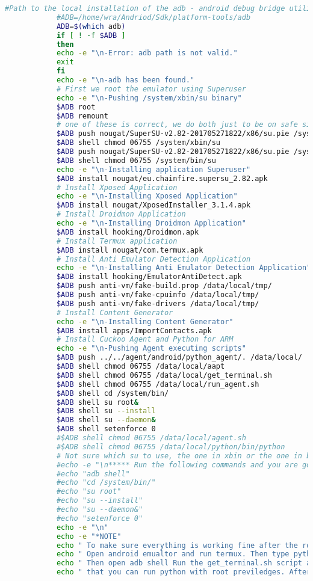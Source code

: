 \documentclass[../main.tex]{subfile}
\begin{document}
\begin{enumerate}
\begin{lstlisting}[language=bash]
			#Path to the local installation of the adb - android debug bridge utility.
			#ADB=/home/wra/Andriod/Sdk/platform-tools/adb
			ADB=$(which adb)
			if [ ! -f $ADB ]
			then
			echo -e "\n-Error: adb path is not valid."
			exit
			fi
			echo -e "\n-adb has been found."
			# First we root the emulator using Superuser
			echo -e "\n-Pushing /system/xbin/su binary"
			$ADB root
			$ADB remount
			# one of these is correct, we do both just to be on safe side
			$ADB push nougat/SuperSU-v2.82-201705271822/x86/su.pie /system/xbin/su
			$ADB shell chmod 06755 /system/xbin/su
			$ADB push nougat/SuperSU-v2.82-201705271822/x86/su.pie /system/bin/su
			$ADB shell chmod 06755 /system/bin/su
			echo -e "\n-Installing application Superuser"
			$ADB install nougat/eu.chainfire.supersu_2.82.apk
			# Install Xposed Application
			echo -e "\n-Installing Xposed Application"
			$ADB install nougat/XposedInstaller_3.1.4.apk
			# Install Droidmon Application
			echo -e "\n-Installing Droidmon Application"
			$ADB install hooking/Droidmon.apk
			# Install Termux application
			$ADB install nougat/com.termux.apk
			# Install Anti Emulator Detection Application
			echo -e "\n-Installing Anti Emulator Detection Application"
			$ADB install hooking/EmulatorAntiDetect.apk
			$ADB push anti-vm/fake-build.prop /data/local/tmp/
			$ADB push anti-vm/fake-cpuinfo /data/local/tmp/
			$ADB push anti-vm/fake-drivers /data/local/tmp/
			# Install Content Generator
			echo -e "\n-Installing Content Generator"
			$ADB install apps/ImportContacts.apk
			# Install Cuckoo Agent and Python for ARM
			echo -e "\n-Pushing Agent executing scripts"
			$ADB push ../../agent/android/python_agent/. /data/local/ 
			$ADB shell chmod 06755 /data/local/aapt
			$ADB shell chmod 06755 /data/local/get_terminal.sh
			$ADB shell chmod 06755 /data/local/run_agent.sh
			$ADB shell cd /system/bin/
			$ADB shell su root&
			$ADB shell su --install
			$ADB shell su --daemon&
			$ADB shell setenforce 0
			#$ADB shell chmod 06755 /data/local/agent.sh
			#$ADB shell chmod 06755 /data/local/python/bin/python
			# Not sure which su to use, the one in xbin or the one in bin
			#echo -e "\n***** Run the following commands and you are good to go*****\n"
			#echo "adb shell"
			#echo "cd /system/bin/"
			#echo "su root"
			#echo "su --install"
			#echo "su --daemon&"
			#echo "setenforce 0"
			echo -e "\n"
			echo -e "*NOTE"
			echo " To make sure everything is working fine after the rooting is done, do the following:"
			echo " Open android emualtor and run termux. Then type python2 to make sure to that python is installed"
			echo " Then open adb shell Run the get_terminal.sh script and then type python2 to verify that you "
			echo " that you can run python with root previledges. After that run run_agent.sh and verify that agent is running."
			\end{lstlisting}
			

\end{enumerate}
\end{document}
